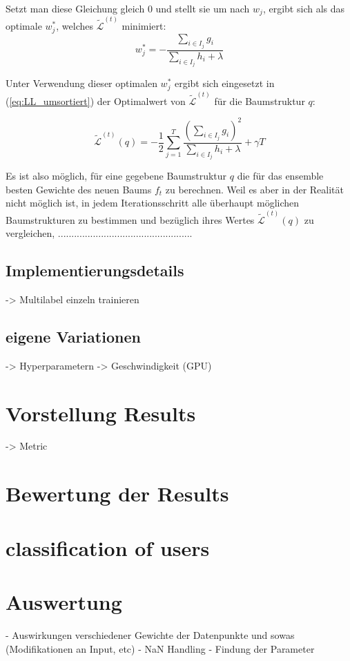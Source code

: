 \documentclass[a4paper,12pt]{scrartcl}
\newcommand{\LL}{\ensuremath{\mathcal{L}}}
\begin{document}
Setzt man diese Gleichung gleich $0$ und stellt sie um nach $w_j$, ergibt sich als das optimale $w^*_j$, welches $\tilde{\LL}^{(t)}$ minimiert:
\begin{equation}
	w_j^* = - \frac{\sum_{i \in I_j} g_i}{\sum_{i \in I_j} h_i + \lambda}
\end{equation}

Unter Verwendung dieser optimalen $w_j^*$ ergibt sich eingesetzt in (\ref{eq:LL_umsortiert}) der Optimalwert von $\tilde{\LL}^{(t)}$ für die Baumstruktur $q$:

\begin{equation}
	\tilde{\LL}^{(t)} (q) = - \frac{1}{2} \sum_{j=1}^{T} \frac{(\sum_{i \in I_j} g_i)^2}{\sum_{i \in I_j} h_i + \lambda} + \gamma T
\end{equation}

Es ist also möglich, für eine gegebene Baumstruktur $q$ die für das ensemble besten Gewichte des neuen Baums $f_t$ zu berechnen. Weil es aber in der Realität nicht möglich ist, in jedem Iterationsschritt alle überhaupt möglichen Baumstrukturen zu bestimmen und bezüglich ihres Wertes $\tilde{\LL}^{(t)} (q)$ zu vergleichen, ..................................................


\subsection{Implementierungsdetails}
-> Multilabel einzeln trainieren

\subsection{eigene Variationen}
-> Hyperparametern
-> Geschwindigkeit (GPU)


\section{Vorstellung Results}
-> Metric

\section{Bewertung der Results}

\section{classification of users}

\section{Auswertung}
- Auswirkungen verschiedener Gewichte der Datenpunkte und sowas (Modifikationen an Input, etc)
- NaN Handling
- Findung der Parameter
\end{document}
